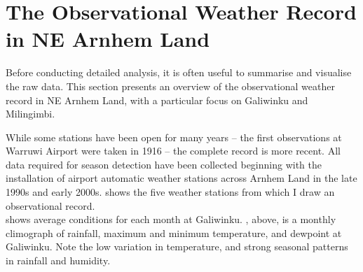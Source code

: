 \section{The Observational Weather Record in NE Arnhem Land}

Before conducting detailed analysis, it is often useful to summarise and
visualise the raw data.  This section presents an overview of the
observational weather record in NE Arnhem Land, with a particular focus
on Galiwinku and Milingimbi.

While some stations have been open for many years -- the first observations
at Warruwi Airport were taken in 1916 -- the complete record is more recent.
All data required for season detection have been collected beginning with
the installation of airport automatic weather stations across Arnhem Land
in the late 1990s and early 2000s.   shows
the five weather stations from which I draw an observational record.\\


 shows average conditions for each
month at Galiwinku.  , above, is a monthly
climograph of rainfall, maximum and minimum temperature, and dewpoint at
Galiwinku.  Note the low variation in temperature, and strong seasonal
patterns in rainfall and humidity.

~\\



